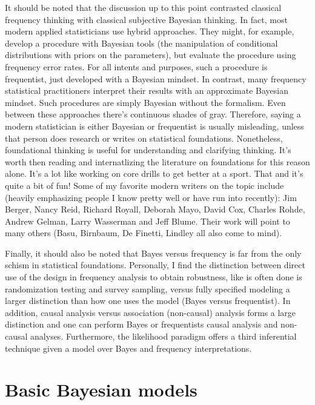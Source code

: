 It should be noted that the discussion up to this point contrasted classical
frequency thinking with classical subjective Bayesian thinking. In fact, most modern
applied statisticians use hybrid approaches. They might, for example, develop a
procedure with Bayesian tools (the manipulation of conditional distributions with 
priors on the parameters), but evaluate the procedure using frequency error rates. 
For all intents and purposes, such a procedure is frequentist, just developed
with a Bayesian mindset. In contrast, many frequency statistical practitioners 
interpret their results with an approximate Bayesian mindset. Such procedures
are simply Bayesian without the formalism. Even between these approaches there's
continuous shades of gray. Therefore, saying a modern
statistician is either Bayesian or frequentist is usually misleading, unless
that person does research or writes on statistical foundations. Nonetheless, foundational
thinking is useful for understanding and clarifying thinking. It's worth then
reading and internatlizing the literature on foundations for this reason alone. It's a lot like
working on core drills to get better at a sport. That and it's quite a bit of fun! Some of my favorite modern writers on the topic include (heavily
emphasizing people I know pretty well or have run into recently):
Jim Berger, Nancy Reid, 
Richard Royall, Deborah Mayo, David Cox, Charles Rohde, Andrew Gelman,
Larry Wasserman
and  Jeff Blume. Their work will point to many others (Basu, Birnbaum, De Finetti, Lindley all also come to mind).


Finally, it should also be noted that Bayes versus frequency is far from the only
schism in statistical foundations. Personally, I find the distinction between direct
use of the design in frequency analysis to obtain robustness, like is often done is randomization testing and survey sampling,  versus fully specified 
modeling a larger distinction than
how one uses the model (Bayes versus frequentist). In addition, causal analysis
versus association (non-causal) analysis forms a large distinction and one can perform Bayes or
frequentists causal analysis and non-causal analyses. Furthermore, the likelihood
paradigm \citep{royall1997statistical} offers a third inferential 
technique given a model over Bayes and frequency interpretations.


\section{Basic Bayesian models}
